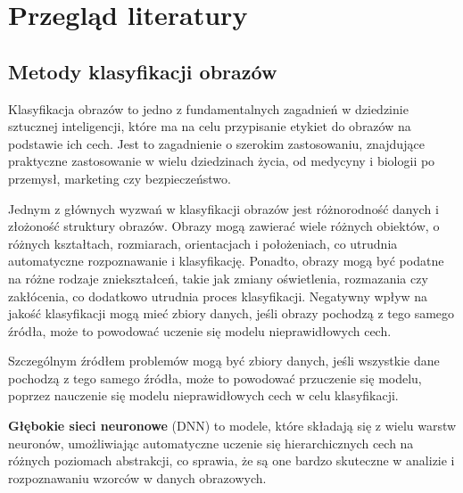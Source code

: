 
\chapter*{Przegląd literatury}
\section*{Metody klasyfikacji obrazów}

Klasyfikacja obrazów to jedno z fundamentalnych zagadnień w dziedzinie sztucznej inteligencji, które ma na celu przypisanie etykiet do obrazów na podstawie ich cech.
Jest to zagadnienie o szerokim zastosowaniu, znajdujące praktyczne zastosowanie w wielu dziedzinach życia, od medycyny i biologii po przemysł, marketing czy bezpieczeństwo.

Jednym z głównych wyzwań w klasyfikacji obrazów jest różnorodność danych i złożoność struktury obrazów.
Obrazy mogą zawierać wiele różnych obiektów, o różnych kształtach, rozmiarach, orientacjach i położeniach, co utrudnia automatyczne rozpoznawanie i klasyfikację.
Ponadto, obrazy mogą być podatne na różne rodzaje zniekształceń, takie jak zmiany oświetlenia, rozmazania czy zakłócenia, co dodatkowo utrudnia proces klasyfikacji.
Negatywny wpływ na jakość klasyfikacji mogą mieć zbiory danych, jeśli obrazy pochodzą z tego samego źródła, może to powodować uczenie się modelu nieprawidłowych cech.

Szczególnym źródłem problemów mogą być zbiory danych, jeśli wszystkie dane pochodzą z tego samego źródła, może to powodować przuczenie się modelu, poprzez nauczenie się modelu nieprawidłowych cech w celu klasyfikacji.

\textbf{Głębokie sieci neuronowe} (DNN) to modele, które składają się z wielu warstw neuronów, umożliwiając automatyczne uczenie się hierarchicznych cech na różnych poziomach abstrakcji, co sprawia, że są one bardzo skuteczne w analizie i rozpoznawaniu wzorców w danych obrazowych.

